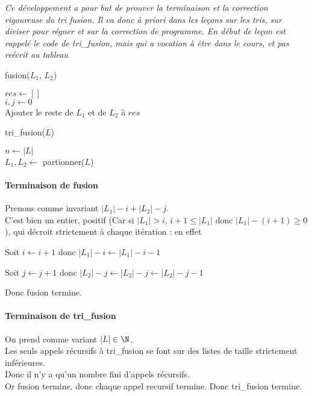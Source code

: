 
\textit{Ce développement a pour but de prouver la terminaison et la correction rigoureuse du tri fusion. Il va donc à priori dans les leçons sur les tris, sur diviser pour régner et sur la correction de programme. En début de leçon est rappelé le code de tri\_fusion, mais qui a vocation à être dans le cours, et pas reécrit au tableau}

\begin{algorithm}[H]
	\caption{fusion($L_1$, $L_2$)}
	$res \gets []$\\
	$i,j \gets 0$\\
	Ajouter le reste de $L_1$ et de $L_2$ à $res$\\
\end{algorithm}

\begin{algorithm}[H]
	\caption{tri\_fusion($L$)}
	$n \gets |L|$\\
	$L_1, L_2 \gets$ partionner($L$)\\
\end{algorithm}

\paragraph{Terminaison de fusion}
	Prenons comme invariant $|L_1| - i + |L_2| - j$.\\
	C'est bien un entier, positif (Car si $|L_1| > i$, $i+1 \leq |L_1|$ donc $|L_1| - (i+1) \geq 0$), qui décroit strictement à chaque itération : en effet 
	
		Soit $i \gets i+1$ donc $|L_1|-i \gets |L_1|-i-1$
	
		Soit $j \gets j+1$ donc $|L_2|-j \gets |L_2|-j \gets |L_2|-j-1$
		
	Donc fusion termine.

\paragraph{Terminaison de tri\_fusion} On prend comme variant $|L| \in \N$.\\
Les seuls appels récursifs à tri\_fusion se font sur des listes de taille strictement inférieures.\\
Donc il n'y a qu'un nombre fini d'appels récursifs.\\
Or fusion termine, donc chaque appel recursif termine. Donc tri\_fusion termine.

